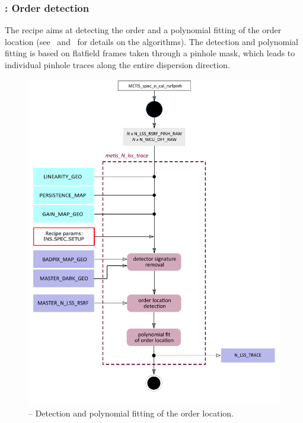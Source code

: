 \subsubsection{:  Order detection}\label{rec:metis_n_lss_trace}
The recipe  aims at detecting the order and a polynomial fitting of the order location (see~\cite{pis02} and~\cite{pis21} for details on the algorithms). The detection and polynomial fitting is based on flatfield frames taken through a pinhole mask, which leads to individual pinhole traces along the entire dispersion direction.

\begin{figure}[ht]
  \centering
  \includegraphics[width=0.5\textheight]{figures/metis_N_lss_trace_v0.84.pdf}
  \caption[Recipe: ]{ --
    Detection and polynomial fitting of the order location.}
  \label{Fig:rec_N_lss_wave}
\end{figure}

